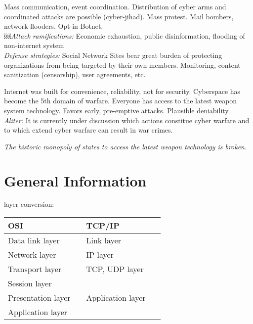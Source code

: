 Mass communication, event coordination. Distribution of cyber arms and coordinated attacks are possible (cyber-jihad). Mass protest. Mail bombers, network flooders. Opt-in Botnet.\\
\textit{￼Attack ramifications:} Economic exhaustion, public disinformation, flooding of non-internet system \\
\textit{Defense strategies:} Social Network Sites bear great burden of protecting organizations from being targeted by their own members. Monitoring, content sanitization (censorship), user agreements, etc.

 Internet was built for convenience, reliability, not for security. Cyberspace has become the 5th domain of warfare. Everyone has access to the latest weapon system technology. Favors early, pre-emptive attacks. Plausible deniability. \\ \textit{Aliter:} It is currently under discussion which actions constitue cyber warfare and to which extend cyber warfare can result in war crimes.

\textit{The historic monopoly of states to access the latest weapon technology is broken.}

\section{General Information}

 layer conversion:

\begin{tabular}{|p{0.45\linewidth}|p{0.45\linewidth}|}
\hline
\textbf{OSI} & \textbf{TCP/IP} \\
\hline
\hline
Data link layer & Link layer \\
\hline
Network layer & IP layer \\
\hline
Transport layer & TCP, UDP layer \\
\hline
Session layer & \multirow{3}{*}{Application layer} \\
Presentation layer & \\
Application layer & \\
\hline
\end{tabular}
